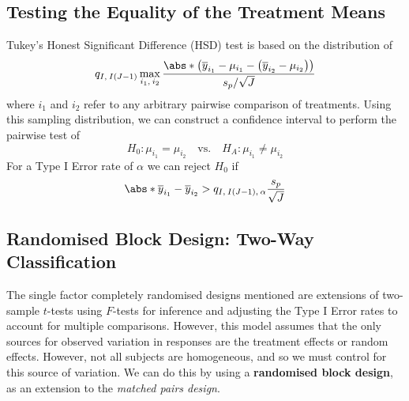 \documentclass{article}
\begin{document}
\subsection{Testing the Equality of the Treatment Means}
Tukey's Honest Significant Difference (HSD) test is based on the
distribution of
\begin{equation*}
    q_{I,\: I\left( J - 1 \right)} \max_{i_1,\: i_2} \frac{\abs*{\left( \overline{y}_{i_1} - \mu_{i_1} - \left( \overline{y}_{i_2} - \mu_{i_2} \right) \right)}}{s_p / \sqrt{J}}
\end{equation*}
where \(i_1\) and \(i_2\) refer to any arbitrary pairwise comparison of treatments. Using this sampling distribution, we can construct a confidence interval to perform the
pairwise test of
\begin{equation*}
    H_0 : \mu_{i_1} = \mu_{i_2} \quad \text{vs.} \quad H_A : \mu_{i_1} \neq \mu_{i_2}
\end{equation*}
For a Type I Error rate of \(\alpha\) we can reject \(H_0\) if
\begin{equation*}
    \abs*{\overline{y}_{i_1} - \overline{y}_{i_2}} > q_{I,\: I\left( J - 1 \right),\: \alpha} \frac{s_p}{\sqrt{J}}
\end{equation*}
\subsection{Randomised Block Design: Two-Way Classification}
The single factor completely randomised designs mentioned are
extensions of two-sample \(t\)-tests using \(F\)-tests for inference
and adjusting the Type I Error rates to account for multiple
comparisons. However, this model assumes that the only sources for
observed variation in responses are the treatment effects or random
effects. However, not all subjects are homogeneous, and so we must
control for this source of variation. We can do this by using a
\textbf{randomised block design}, as an extension to the
\textit{matched pairs design}.
\end{document}
